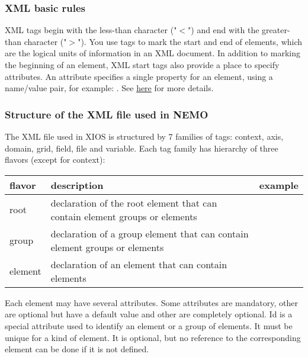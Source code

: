 \documentclass[../tex_main/NEMO_manual]{subfiles}
\begin{document}
\subsubsection{ XML basic rules}

XML tags begin with the less-than character ("$<$") and end with the greater-than character ("$>$").
You use tags to mark the start and end of elements, which are the logical units of information in 
an XML document.
In addition to marking the beginning of an element, XML start tags also provide a place to 
specify attributes.
An attribute specifies a single property for an element, using a name/value pair, for example: 
.
See \href{http://www.xmlnews.org/docs/xml-basics.html}{here} for more details.

\subsubsection{Structure of the XML file used in NEMO}

The XML file used in XIOS is structured by 7 families of tags: 
context, axis, domain, grid, field, file and variable.
Each tag family has hierarchy of three flavors (except for context):

\begin{table} \scriptsize
	\begin{tabular*}{\textwidth}{|p{}p{}p{}|} \hline
		flavor  & description                                                                 &
		example                          \\ \hline \hline
		root    & declaration of the root element that can contain element groups or elements &
		\xmlcode{<file_definition ... >} \\ \hline
		group   & declaration of a group element that can contain element groups or elements  &
		\xmlcode{<file_group      ... >} \\ \hline
		element & declaration of an element that can contain elements                         &
		\xmlcode{<file            ... >} \\ \hline
	\end{tabular*}
\end{table}

Each element may have several attributes.
Some attributes are mandatory, other are optional but have a default value and 
other are completely optional.
Id is a special attribute used to identify an element or a group of elements.
It must be unique for a kind of element.
It is optional, but no reference to the corresponding element can be done if it is not defined.
\end{document}
